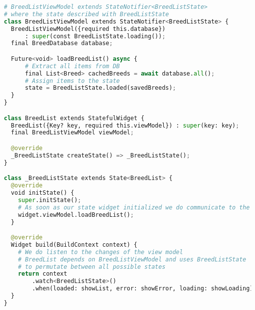 \begin{lstlisting}[style=light, language=Python,label={lst:flutter_sqflite},caption=Flutter SQFLITE]
# BreedListViewModel extends StateNotifier<BreedListState>
# where the state described with BreedListState
class BreedListViewModel extends StateNotifier<BreedListState> {
  BreedListViewModel({required this.database})
      : super(const BreedListState.loading());
  final BreedDatabase database;

  Future<void> loadBreedList() async {
      # Extract all items from DB
      final List<Breed> cachedBreeds = await database.all();
      # Assign items to the state
      state = BreedListState.loaded(savedBreeds);
  }
}

class BreedList extends StatefulWidget {
  BreedList({Key? key, required this.viewModel}) : super(key: key);
  final BreedListViewModel viewModel;

  @override
  _BreedListState createState() => _BreedListState();
}

class _BreedListState extends State<BreedList> {
  @override
  void initState() {
    super.initState();
    # As soon as our state widget initialized we do communicate to the view model
    widget.viewModel.loadBreedList();
  }

  @override
  Widget build(BuildContext context) {
    # We do listen to the changes of the view model
    # BreedList depends on BreedListViewModel and uses BreedListState
    # to permutate between all possible states
    return context
        .watch<BreedListState>()
        .when(loaded: showList, error: showError, loading: showLoading);
  }
}
\end{lstlisting}
